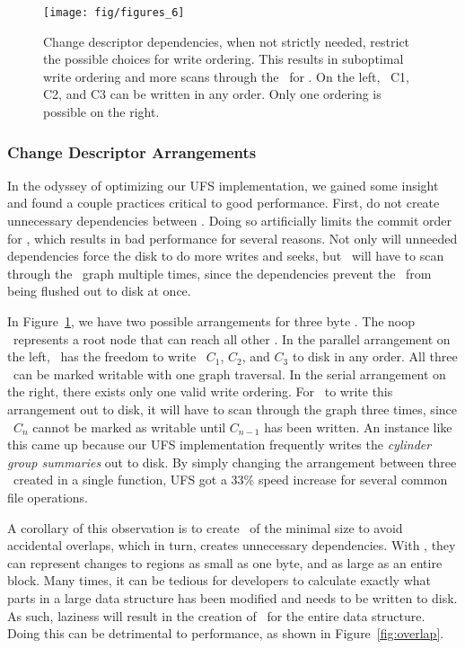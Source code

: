 \begin{figure}[htb]
  \centering
  \texttt{[image: fig/figures\_6]}
  \caption{\label{fig:chdescarrange} Change descriptor dependencies, when
  not strictly needed, restrict the possible choices for write ordering.
  This results in suboptimal write ordering and more scans through the
  \chdescs\ for \Kudos. On the left, \chdescs\ C1, C2, and C3 can be written
  in any order. Only one ordering is possible on the right.}
\end{figure}

\subsubsection {Change Descriptor Arrangements}
In the odyssey of optimizing our UFS implementation, we gained some insight and
found a couple practices critical to good performance. First, do not create
unnecessary dependencies between \chdescs. Doing so artificially limits the
commit order for \chdescs, which results in bad performance for several
reasons. Not only will unneeded dependencies force the disk to do more writes
and seeks, but \Kudos\ will have to scan through the \chdesc\ graph multiple
times, since the dependencies prevent the \chdescs\ from being flushed out to
disk at once.

In Figure~\ref{fig:chdescarrange}, we have two possible arrangements for three
byte \chdescs. The noop \chdesc\ represents a root node that can reach all
other \chdescs. In the parallel arrangement on the left, \Kudos\ has the
freedom to write \chdescs\ $C_1$, $C_2$, and $C_3$ to disk in any order. All
three \chdescs\ can be marked writable with one graph traversal. In the serial
arrangement on the right, there exists only one valid write ordering. For
\Kudos\ to write this arrangement out to disk, it will have to scan through
the graph three times, since \chdesc\ $C_n$ cannot be marked as writable until
$C_{n-1}$ has been written.
An instance like this came up because our UFS implementation frequently writes
the \emph{cylinder group summaries} out to disk. By simply changing the
arrangement between three \chdescs\ created in a single function, UFS got a
33\% speed increase for several common file operations.

A corollary of this observation is to create \chdescs\ of the minimal size
to avoid accidental overlaps, which in turn, creates unnecessary dependencies.
With \chdescs, they can represent changes to regions as small as one byte, and
as large as an entire block. Many times, it can be tedious for developers
to calculate exactly what parts in a large data structure has been modified and
needs to be written to disk. As such, laziness will result in the creation of
\chdescs\ for the entire data structure. Doing this can be detrimental to
performance, as shown in Figure~\ref{fig:overlap}.

